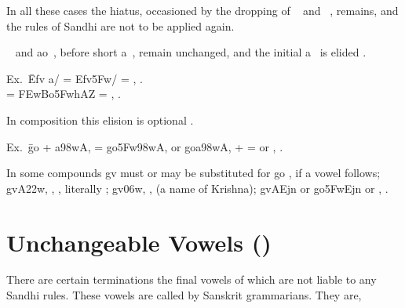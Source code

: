 \s In all these cases the hiatus, occasioned by the dropping of
{\dn {}}~ and {\dn {}}~, remains, and the rules of Sandhi are not to
be applied again.

~ and {\dn ao}~, before short {\dn a}~, remain unchanged,
and the initial {\dn a}~ is elided .

\begin{tabbing}
  Ex.\ \={\dn Efv\? a/} = {\dn Efv\?\35Fw/}  = ,
  .\\
   = {\dn \3FEwBo\35FwhAZ} 
  = , .
\end{tabbing}

In composition this elision is optional .

\begin{tabbing}
  Ex.\ \={\dn go} + {\dn a\398wA,} = {\dn go\35Fw\398wA,} or {\dn go{}a\398wA,}  +
   =  or , .
\end{tabbing}

In some compounds {\dn gv}  must or may be substituted for {\dn go}
, if a vowel follows; {\dn gvA\322w,} , , literally ; {\dn gv\?\306w,} ,
 (a name of Krishna); {\dn gvAEjn\2} or {\dn go\35FwEjn\2}
 or , .

\section{Unchangeable Vowels ()}
\s There are certain terminations the final vowels of which are not
liable to any Sandhi rules. These vowels are called 
 by Sanskrit grammarians. They are,

